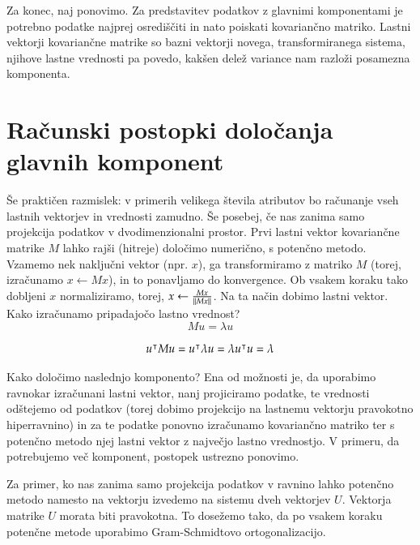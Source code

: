 Za konec, naj ponovimo. Za predstavitev podatkov z glavnimi komponentami je potrebno podatke najprej osrediščiti in nato poiskati kovariančno matriko. Lastni vektorji kovariančne matrike so bazni vektorji novega, transformiranega sistema, njihove lastne vrednosti pa povedo, kakšen delež variance nam razloži posamezna komponenta.

\section{Računski postopki določanja glavnih komponent}

Še praktičen razmislek: v primerih velikega števila atributov bo računanje vseh lastnih vektorjev in vrednosti zamudno. Še posebej, če nas zanima samo projekcija podatkov v dvodimenzionalni prostor. Prvi lastni vektor kovariančne matrike $M$ lahko rajši (hitreje) določimo numerično, s potenčno metodo. Vzamemo nek naključni vektor (npr. $x$), ga transformiramo z matriko $M$ (torej, izračunamo $x\leftarrow M x$), in to ponavljamo do konvergence. Ob vsakem koraku tako dobljeni $x$ normaliziramo, torej, $x\leftarrow \frac{M x}{\left\lVert M x\right\rVert}$. Na ta način dobimo lastni vektor. Kako izračunamo pripadajočo lastno vrednost?
\begin{equation}
  M u = \lambda u
\end{equation}

\begin{equation}
  u^\intercal M u = u^\intercal \lambda u = \lambda u^\intercal u = \lambda
\end{equation}

Kako določimo naslednjo komponento? Ena od možnosti je, da uporabimo ravnokar izračunani lastni vektor, nanj projiciramo podatke, te vrednosti odštejemo od podatkov (torej dobimo projekcijo na lastnemu vektorju pravokotno hiperravnino) in za te podatke ponovno izračunamo kovariančno matriko ter s potenčno metodo njej lastni vektor z največjo lastno vrednostjo. V primeru, da potrebujemo več komponent, postopek ustrezno ponovimo.

Za primer, ko nas zanima samo projekcija podatkov v ravnino lahko potenčno metodo namesto na vektorju izvedemo na sistemu dveh vektorjev $U$. Vektorja matrike $U$ morata biti pravokotna. To dosežemo tako, da po vsakem koraku potenčne metode uporabimo Gram-Schmidtovo ortogonalizacijo.

\endinput

\section{Singularni razcep}

